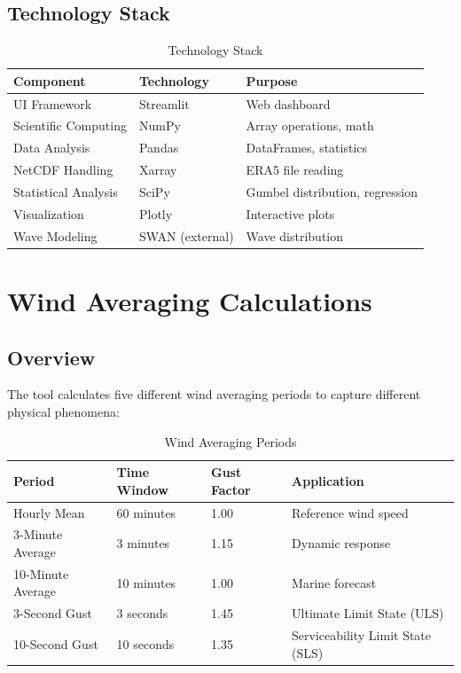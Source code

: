 \documentclass[12pt]{article}
\begin{document}
\subsection{Technology Stack}

\begin{table}[H]
\centering
\caption{Technology Stack}
\begin{tabular}{|l|l|l|}
\hline
\textbf{Component} & \textbf{Technology} & \textbf{Purpose} \\
\hline
UI Framework & Streamlit & Web dashboard \\
Scientific Computing & NumPy & Array operations, math \\
Data Analysis & Pandas & DataFrames, statistics \\
NetCDF Handling & Xarray & ERA5 file reading \\
Statistical Analysis & SciPy & Gumbel distribution, regression \\
Visualization & Plotly & Interactive plots \\
Wave Modeling & SWAN (external) & Wave distribution \\
\hline
\end{tabular}
\end{table}

\newpage

\section{Wind Averaging Calculations}

\subsection{Overview}

The tool calculates five different wind averaging periods to capture different physical phenomena:

\begin{table}[H]
\centering
\caption{Wind Averaging Periods}
\begin{tabular}{|l|l|l|l|}
\hline
\textbf{Period} & \textbf{Time Window} & \textbf{Gust Factor} & \textbf{Application} \\
\hline
Hourly Mean & 60 minutes & 1.00 & Reference wind speed \\
3-Minute Average & 3 minutes & 1.15 & Dynamic response \\
10-Minute Average & 10 minutes & 1.00 & Marine forecast \\
3-Second Gust & 3 seconds & 1.45 & Ultimate Limit State (ULS) \\
10-Second Gust & 10 seconds & 1.35 & Serviceability Limit State (SLS) \\
\hline
\end{tabular}
\end{table}
\end{document}
